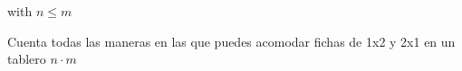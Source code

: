  with $n \leq m$

Cuenta todas las maneras en las que puedes acomodar fichas de 1x2 y 2x1 en un tablero $n \cdot m$ \\